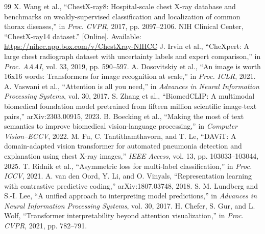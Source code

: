\documentclass[conference,letterpaper]{IEEEtran}
\begin{document}
\begin{thebibliography}{99}
 X. Wang et al., ``ChestX-ray8: Hospital-scale chest X-ray database and benchmarks on weakly-supervised classification and localization of common thorax diseases,'' in \emph{Proc. CVPR}, 2017, pp. 2097--2106.
 NIH Clinical Center, ``ChestX-ray14 dataset.'' [Online]. Available: \url{https://nihcc.app.box.com/v/ChestXray-NIHCC}
 J. Irvin et al., ``CheXpert: A large chest radiograph dataset with uncertainty labels and expert comparison,'' in \emph{Proc. AAAI}, vol. 33, 2019, pp. 590--597.
 A. Dosovitskiy et al., ``An image is worth 16x16 words: Transformers for image recognition at scale,'' in \emph{Proc. ICLR}, 2021.
 A. Vaswani et al., ``Attention is all you need,'' in \emph{Advances in Neural Information Processing Systems}, vol. 30, 2017.
 S. Zhang et al., ``BiomedCLIP: A multimodal biomedical foundation model pretrained from fifteen million scientific image-text pairs,'' arXiv:2303.00915, 2023.
 B. Boecking et al., ``Making the most of text semantics to improve biomedical vision-language processing,'' in \emph{Computer Vision--ECCV}, 2022.
 M. Fu, C. Tantithamthavorn, and T. Le, ``DAViT: A domain-adapted vision transformer for automated pneumonia detection and explanation using chest X-ray images,'' \emph{IEEE Access}, vol. 13, pp. 103033--103044, 2025.
 T. Ridnik et al., ``Asymmetric loss for multi-label classification,'' in \emph{Proc. ICCV}, 2021.
 A. van den Oord, Y. Li, and O. Vinyals, ``Representation learning with contrastive predictive coding,'' arXiv:1807.03748, 2018.
 S. M. Lundberg and S.-I. Lee, ``A unified approach to interpreting model predictions,'' in \emph{Advances in Neural Information Processing Systems}, vol. 30, 2017.
 H. Chefer, S. Gur, and L. Wolf, ``Transformer interpretability beyond attention visualization,'' in \emph{Proc. CVPR}, 2021, pp. 782--791.
\end{thebibliography}
\end{document}
